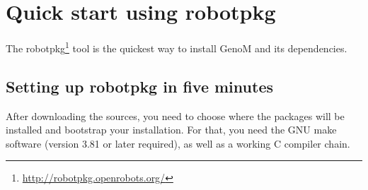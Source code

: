 %
%
%
%
%
%
%


\section{Quick start using robotpkg}

The robotpkg\footnote{\url{http://robotpkg.openrobots.org/}} tool is
the quickest way to install GenoM and its dependencies. 

\subsection{Setting up robotpkg in five minutes}


After downloading the sources, you need to choose where the packages
will be installed and bootstrap your installation. For that, you need
the GNU make software (version 3.81 or later required), as well as a
working C compiler chain.

